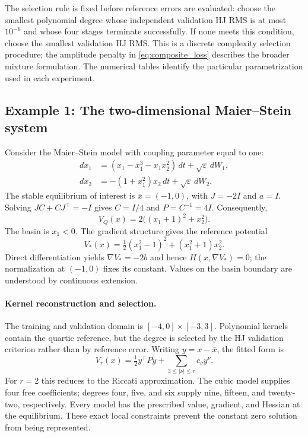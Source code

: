 \documentclass[11pt]{article}
\theoremstyle{plain}      %
\theoremstyle{definition} %
\begin{document}
The selection rule is fixed before reference errors are evaluated: choose the smallest polynomial degree whose independent validation HJ RMS is at most $10^{-6}$ and whose four stages terminate successfully. If none meets this condition, choose the smallest validation HJ RMS. This is a discrete complexity selection procedure; the amplitude penalty in \eqref{eq:composite_loss} describes the broader mixture formulation. The numerical tables identify the particular parametrization used in each experiment.

\subsection{Example 1: The two-dimensional Maier--Stein system}\label{sec:example1}
Consider the Maier--Stein model with coupling parameter equal to one:
\begin{equation}\label{eq:ms-sde}
\begin{aligned}
 dx_1&=(x_1-x_1^3-x_1x_2^2)\,dt+\sqrt\varepsilon\,dW_1,\\
 dx_2&=-(1+x_1^2)x_2\,dt+\sqrt\varepsilon\,dW_2.
\end{aligned}
\end{equation}
The stable equilibrium of interest is $\bar x=(-1,0)$, with $J=-2I$ and $a=I$. Solving $JC+CJ^\top=-I$ gives $C=I/4$ and $P=C^{-1}=4I$. Consequently,
\[
 V_Q(x)=2\bigl((x_1+1)^2+x_2^2\bigr).
\]
The basin is $x_1<0$. The gradient structure gives the reference potential
\begin{equation}\label{eq:ms-reference}
 V_*(x)=\tfrac12(x_1^2-1)^2+(x_1^2+1)x_2^2.
\end{equation}
Direct differentiation yields $\nabla V_*=-2b$ and hence $H(x,\nabla V_*)=0$; the normalization at $(-1,0)$ fixes its constant. Values on the basin boundary are understood by continuous extension.

\paragraph{Kernel reconstruction and selection.}
The training and validation domain is $[-4,0]\times[-3,3]$. Polynomial kernels contain the quartic reference, but the degree is selected by the HJ validation criterion rather than by reference error. Writing $y=x-\bar x$, the fitted form is
\[
 V_r(x)=\tfrac12y^\top Py+\sum_{3\leq|\nu|\leq r}c_\nu y^\nu.
\]
For $r=2$ this reduces to the Riccati approximation. The cubic model supplies four free coefficients; degrees four, five, and six supply nine, fifteen, and twenty-two, respectively. Every model has the prescribed value, gradient, and Hessian at the equilibrium. These exact local constraints prevent the constant zero solution from being represented.
\end{document}
